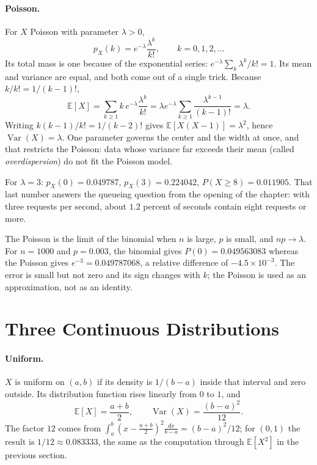 \paragraph{Poisson.} For $X$ Poisson with parameter $\lambda>0$,
\[
p_X(k)=e^{-\lambda}\frac{\lambda^k}{k!},\qquad k=0,1,2,\dots
\]
Its total mass is one because of the exponential series:
$e^{-\lambda}\sum_k\lambda^k/k!=1$. Its mean and variance are equal, and both
come out of a single trick. Because $k/k!=1/(k-1)!$,
\[
\mathbb{E}[X]=\sum_{k\ge1}k\,e^{-\lambda}\frac{\lambda^k}{k!}
=\lambda e^{-\lambda}\sum_{k\ge1}\frac{\lambda^{k-1}}{(k-1)!}=\lambda .
\]
Writing $k(k-1)/k!=1/(k-2)!$ gives $\mathbb{E}[X(X-1)]=\lambda^2$, hence
$\operatorname{Var}(X)=\lambda$. One parameter governs the center and the width at once, and that
restricts the Poisson: data whose variance far exceeds their mean (called
\emph{overdispersion}) do not fit the Poisson model.

For $\lambda=3$: $p_X(0)=0.049787$, $p_X(3)=0.224042$,
$P(X\ge8)=0.011905$. That last number answers the queueing question from the opening of the chapter:
with three requests per second, about $1.2$ percent of seconds contain eight
requests or more.

The Poisson is the limit of the binomial when $n$ is large, $p$ is small, and $np\to\lambda$. For
$n=1000$ and $p=0.003$, the binomial gives $P(0)=0.049563083$ whereas the Poisson
gives $e^{-3}=0.049787068$, a relative difference of $-4.5\times10^{-3}$. The error is small but
not zero and its sign changes with $k$; the Poisson is used as an approximation, not as an
identity.

\section{Three Continuous Distributions}

\paragraph{Uniform.} $X$ is uniform on $(a,b)$ if its density is $1/(b-a)$ inside
that interval and zero outside. Its distribution function rises linearly from $0$ to $1$, and
\[
\mathbb{E}[X]=\frac{a+b}{2},\qquad
\operatorname{Var}(X)=\frac{(b-a)^2}{12}.
\]
The factor $12$ comes from $\int_a^b(x-\tfrac{a+b}{2})^2\frac{dx}{b-a}=(b-a)^2/12$; for
$(0,1)$ the result is $1/12\approx0.083333$, the same as the computation through
$\mathbb{E}[X^2]$ in the previous section.

